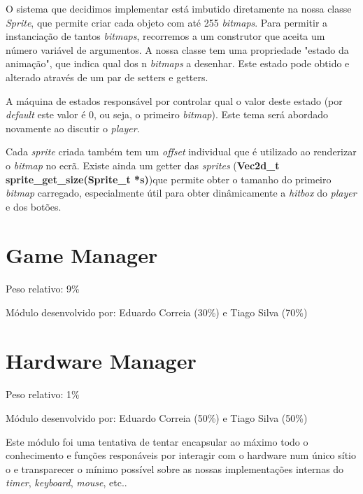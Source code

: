 \documentclass{report}
\begin{document}
O sistema que decidimos implementar está imbutido diretamente na nossa classe \textit{Sprite}, que permite criar cada objeto com até 255 \textit{bitmaps}. Para permitir a instanciação de tantos \textit{bitmaps}, recorremos a um construtor que aceita um número variável de argumentos. A nossa classe tem uma propriedade "estado da animação", que indica qual dos n \textit{bitmaps} a desenhar. Este estado pode obtido e alterado através de um par de setters e getters.

A máquina de estados responsável por controlar qual o valor deste estado (por \textit{default} este valor é 0, ou seja, o primeiro \textit{bitmap}). Este tema será abordado novamente ao discutir o \textit{player}.

Cada \textit{sprite} criada também tem um \textit{offset} individual que é utilizado ao renderizar o \textit{bitmap} no ecrã. Existe ainda um getter das \textit{sprites} (\textbf{Vec2d\_t sprite\_get\_size(Sprite\_t *s)})que permite obter o tamanho do primeiro \textit{bitmap} carregado, especialmente útil para obter dinâmicamente a \textit{hitbox} do \textit{player} e dos botões.\newline


\section{Game Manager}

\paragraph{}
Peso relativo: 9\%

Módulo desenvolvido por: Eduardo Correia (30\%) e Tiago Silva (70\%)

\section{Hardware Manager}

\paragraph{}
Peso relativo: 1\%

Módulo desenvolvido por: Eduardo Correia (50\%) e Tiago Silva (50\%)

Este módulo foi uma tentativa de tentar encapsular ao máximo todo o conhecimento e funções responáveis por interagir com o hardware num único sítio o e transparecer o mínimo possível sobre as nossas implementações internas do \textit{timer}, \textit{keyboard}, \textit{mouse}, etc..
\end{document}
